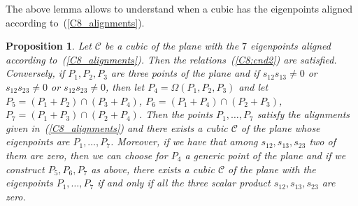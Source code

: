 \documentclass{amsart}
\theoremstyle{plain}
\newtheorem{prop}[lemma]{Proposition}
\theoremstyle{definition}
\begin{document}
%
The above lemma allows to understand when a cubic has the eigenpoints
aligned according to~(\ref{C8_alignments}).
%
\begin{prop}
  Let $\mathcal{C}$ be a cubic of the plane with the $7$ eigenpoints
  aligned according to~(\ref{C8_alignments}).
  Then the relations~(\ref{C8:cnd2}) are satisfied. 
  Conversely, if $P_1, P_2, P_3$ are three points of the plane
  and if $s_{12}s_{13} \not = 0$ or $s_{12}s_{23} \not = 0$ or
  $s_{12}s_{23} \not = 0$, then let $P_4 = \Omega(P_1, P_2, P_3)$
  and let $P_5 = (P_1+P_2) \cap (P_3+P_4)$,
  $P_6 = (P_1+P_4) \cap (P_2+P_3)$, $P_7 = (P_1+P_3) \cap (P_2+P_4)$.
  Then the points $P_1, \dots, P_7$ satisfy the alignments given
  in~(\ref{C8_alignments}) and there exists a cubic $\mathcal{C}$
  of the plane whose eigenpoints are $P_1, \dots, P_7$. Moreover, if
  we have that among $s_{12}, s_{13}, s_{23}$ two of them are zero, 
  then we can choose for $P_4$ a generic point of the plane and if we construct
  $P_5, P_6, P_7$ as above, there exists a cubic $\mathcal{C}$ of the
  plane with the eigenpoints $P_1, \dotsc, P_7$ if and only if
  all the three scalar product $s_{12}, s_{13}, s_{23}$ are zero. 
\end{prop}
%
\end{document}
